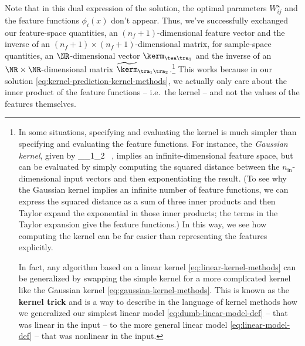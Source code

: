 Note that in this dual expression of the solution, the optimal parameters $W^{\star}_{ij}$ and the feature functions $\phi_i(x)$ don't appear. Thus, we've successfully exchanged our feature-space quantities, an $(n_f+1)$-dimensional feature vector and the inverse of an $(n_f+1)\times(n_f+1)$-dimensional matrix, for sample-space quantities, an $\NR$-dimensional vector $ \kerm_{\tea \tra_1}$ and the inverse of an $\NR \times \NR$-dimensional matrix $\widetilde{\kerm}_{\tra_1 \tra_2}$.\footnote{In some situations,\label{footnote:kernel-vs-feature-functions} specifying and evaluating the kernel is much simpler than specifying and evaluating the feature functions. For instance, the \emph{Gaussian kernel}, given by
\be\label{eq:gaussian-kernel-methods}
\kerm_{\delta_1\delta_2} \equiv \exp\!\le[- \frac{1}{2 \sigma^2} \sum_{i=1}^{n_0} \le(x_{i;\delta_1} - x_{i;\delta_2}\ri)^2  \ri]\, ,
\ee
implies an infinite-dimensional feature space, but can be evaluated by simply computing the squared distance between the $n_\text{in}$-dimensional input vectors and then exponentiating the result. (To see why the Gaussian kernel implies an infinite number of feature functions, we can express the squared distance as a sum of three inner products and then Taylor expand the exponential in those inner products; the terms in the Taylor expansion give the feature functions.) 
In this way, we see how computing the kernel can be far easier than representing the features explicitly.

In fact, any algorithm based on a linear kernel \eqref{eq:linear-kernel-methods} can be generalized by swapping the simple kernel for a more complicated kernel like the Gaussian kernel \eqref{eq:gaussian-kernel-methods}.
This is known as the \textbf{kernel trick} and is a way to describe in the language of kernel methods how we generalized our simplest linear model \eqref{eq:dumb-linear-model-def} -- that was linear in the input -- to the more general linear model \eqref{eq:linear-model-def} -- that was nonlinear in the input.
}
This works because in our solution \eqref{eq:kernel-prediction-kernel-methods}, we actually only care about the inner product of the feature functions -- i.e.~the kernel -- and not the values of the features themselves. 


